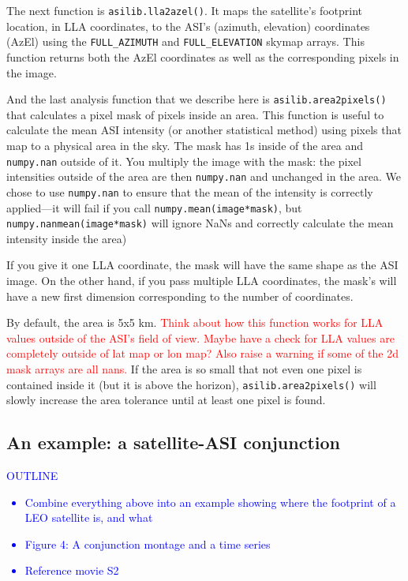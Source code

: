 \documentclass[draft]{agujournal2019}
\begin{document}
The next function is \verb|asilib.lla2azel()|. It maps the satellite's footprint location, in LLA coordinates, to the ASI's (azimuth, elevation) coordinates (AzEl) using the \verb|FULL_AZIMUTH| and \verb|FULL_ELEVATION| skymap arrays. This function returns both the AzEl coordinates as well as the corresponding pixels in the image.

And the last analysis function that we describe here is \verb|asilib.area2pixels()| that calculates a pixel mask of pixels inside an area. This function is useful to calculate the mean ASI intensity (or another statistical method) using pixels that map to a physical area in the sky. The mask has 1s inside of the area and \verb|numpy.nan| outside of it. You multiply the image with the mask: the pixel intensities outside of the area are then \verb|numpy.nan| and unchanged in the area. We chose to use \verb|numpy.nan| to ensure that the mean of the intensity is correctly applied---it will fail if you call \verb|numpy.mean(image*mask)|, but \verb|numpy.nanmean(image*mask)| will ignore NaNs and correctly calculate the mean intensity inside the area)

If you give it one LLA coordinate, the mask will have the same shape as the ASI image. On the other hand, if you pass multiple LLA coordinates, the mask's will have a new first dimension corresponding to the number of coordinates.

By default, the area is 5x5 km. \textcolor{red}{Think about how this function works for LLA values outside of the ASI's field of view. Maybe have a check for LLA values are completely outside of lat map or lon map? Also raise a warning if some of the 2d mask arrays are all nans.} If the area is so small that not even one pixel is contained inside it (but it is above the horizon), \verb|asilib.area2pixels()| will slowly increase the area tolerance until at least one pixel is found.

\subsection{An example: a satellite-ASI conjunction}\label{satellite_conjunction}
\textcolor{blue}{
      OUTLINE
      \begin{itemize}
            \item Combine everything above into an example showing where the footprint of a LEO satellite is, and what 
            \item Figure 4: A conjunction montage and a time series
            \item Reference movie S2
      \end{itemize}
}
\end{document}
